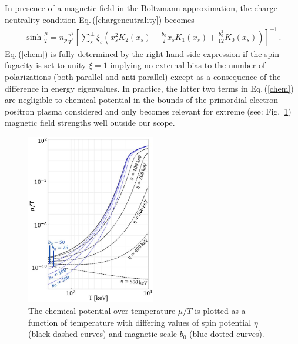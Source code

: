 \documentclass[a4paper]{article}
\newcommand{\req}[1]{Eq.\,(\ref{#1})}
\newcommand{\rf}[1]{Fig.~{\ref{#1}}}
\begin{document}
In presence of a magnetic field in the Boltzmann approximation, the charge neutrality condition \req{chargeneutrality} becomes
\begin{align}
    \label{chem}
    \sinh{\frac{\mu}{T}}=n_{p}\frac{\pi^{2}}{T^{3}}\left[\sum_{s}^{\pm}\xi_{s}\left(x_{s}^{2}K_{2}(x_{s})+\frac{b_{0}}{2}x_{s}K_{1}(x_{s})+\frac{b_{0}^{2}}{12}K_{0}(x_{s})\right)\right]^{-1}\,.
\end{align}
\req{chem} is fully determined by the right-hand-side expression if the spin fugacity is set to unity $\xi=1$ implying no external bias to the number of polarizations (both parallel and anti-parallel) except as a consequence of the difference in energy eigenvalues. In practice, the latter two terms in \req{chem} are negligible to chemical potential in the bounds of the primordial electron-positron plasma considered and only becomes relevant for extreme (see: \rf{fig:chemicalpotential}) magnetic field strengths well outside our scope.

\begin{figure}[ht]
    \centering
    \includegraphics[width=0.5\textwidth]{plots/ChemicalPotential_04.jpg}
    \caption{The chemical potential over temperature $\mu/T$ is plotted as a function of temperature with differing values of spin potential $\eta$ (black dashed curves) and magnetic scale $b_{0}$ (blue dotted curves).}
    \label{fig:chemicalpotential}
\end{figure}
\end{document}
